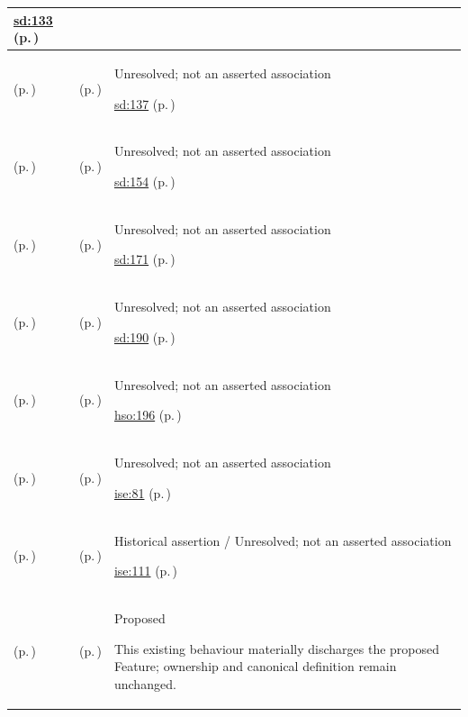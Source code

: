\begin{longtable}{|>{\raggedright\arraybackslash}p{0.27\TableWidth}|>{\raggedright\arraybackslash}p{0.27\TableWidth}|>{\raggedright\arraybackslash}p{0.46\TableWidth}|}
 \hyperref[rad:sd:129]{sd:133} (p.\,\pageref{rad:sd:129})\\\hline
\nameref{service:diagnostic-publication-service} (p.\,\pageref{service:diagnostic-publication-service}) & \nameref{feature:feat-sd-10} (p.\,\pageref{feature:feat-sd-10}) & Unresolved; not an asserted association

 \hyperref[rad:sd:129]{sd:137} (p.\,\pageref{rad:sd:129})\\\hline
\nameref{service:allergy-adverse-reaction-query} (p.\,\pageref{service:allergy-adverse-reaction-query}) & \nameref{feature:feat-sd-12} (p.\,\pageref{feature:feat-sd-12}) & Unresolved; not an asserted association

 \hyperref[rad:sd:147]{sd:154} (p.\,\pageref{rad:sd:147})\\\hline
\nameref{service:preventive-screening-status-query} (p.\,\pageref{service:preventive-screening-status-query}) & \nameref{feature:feat-sd-14} (p.\,\pageref{feature:feat-sd-14}) & Unresolved; not an asserted association

 \hyperref[rad:sd:164]{sd:171} (p.\,\pageref{rad:sd:164})\\\hline
\nameref{service:community-care-team-query} (p.\,\pageref{service:community-care-team-query}) & \nameref{feature:feat-sd-16} (p.\,\pageref{feature:feat-sd-16}) & Unresolved; not an asserted association

 \hyperref[rad:sd:183]{sd:190} (p.\,\pageref{rad:sd:183})\\\hline
\nameref{service:staff-presence-telemetry-query} (p.\,\pageref{service:staff-presence-telemetry-query}) & \nameref{feature:feat-hso-16} (p.\,\pageref{feature:feat-hso-16}) & Unresolved; not an asserted association

 \hyperref[rad:hso:190]{hso:196} (p.\,\pageref{rad:hso:190})\\\hline
\nameref{service:clinical-resource-retrieval-service} (p.\,\pageref{service:clinical-resource-retrieval-service}) & \nameref{feature:feat-ise-09} (p.\,\pageref{feature:feat-ise-09}) & Unresolved; not an asserted association

 \hyperref[rad:ise:73]{ise:81} (p.\,\pageref{rad:ise:73})\\\hline
\nameref{service:consent-enforcement-service} (p.\,\pageref{service:consent-enforcement-service}) & \nameref{feature:feat-ise-12} (p.\,\pageref{feature:feat-ise-12}) & Historical assertion / Unresolved; not an asserted association

 \hyperref[rad:ise:104]{ise:111} (p.\,\pageref{rad:ise:104})\\\hline
\nameref{service:practitioner-directory-query} (p.\,\pageref{service:practitioner-directory-query}) & \nameref{feature:provider-directory-discovery-resolution} (p.\,\pageref{feature:provider-directory-discovery-resolution}) & Proposed

This existing behaviour materially discharges the proposed Feature; ownership and canonical definition remain unchanged.\\\hline
\end{longtable}\endgroup
